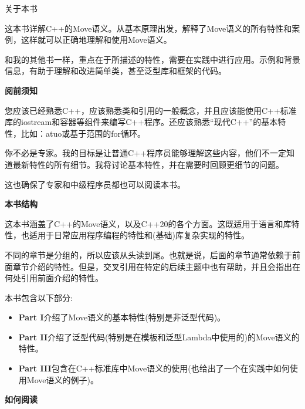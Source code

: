 \begin{flushright}
	 关于本书
\end{flushright}

这本书详解C++的Move语义。从基本原理出发，解释了Move语义的所有特性和案例，这样就可以正确地理解和使用Move语义。\par

和我的其他书一样，重点在于所描述的特性，需要在实践中进行应用。示例和背景信息，有助于理解和改进简单类，甚至泛型库和框架的代码。\par

\hspace*{\fill} \par %
\textbf{阅前须知}

您应该已经熟悉C++，应该熟悉类和引用的一般概念，并且应该能使用C++标准库的iostream和容器等组件来编写C++程序。还应该熟悉“现代C++”的基本特性，比如：atuo或基于范围的for循环。\par

你不必是专家。我的目标是让普通C++程序员能够理解这些内容，他们不一定知道最新特性的所有细节。我将讨论基本特性，并在需要时回顾更细节的问题。\par

这也确保了专家和中级程序员都也可以阅读本书。\par


\hspace*{\fill} \par %
\textbf{本书结构}

这本书涵盖了C++的Move语义，以及C++20的各个方面。这既适用于语言和库特性，也适用于日常应用程序编程的特性和(基础)库复杂实现的特性。\par

不同的章节是分组的，所以应该从头读到尾。也就是说，后面的章节通常依赖于前面章节介绍的特性。但是，交叉引用在特定的后续主题中也有帮助，并且会指出在何处引用前面介绍的特性。\par

本书包含以下部分:\par
\begin{itemize}
	\item \textbf{Part I}介绍了Move语义的基本特性(特别是非泛型代码)。
	\item \textbf{Part II}介绍了泛型代码(特别是在模板和泛型Lambda中使用的)的Move语义的特性。
	\item \textbf{Part III}包含在C++标准库中Move语义的使用(也给出了一个在实践中如何使用Move语义的例子)。
\end{itemize}


\hspace*{\fill} \par %
\textbf{如何阅读}

